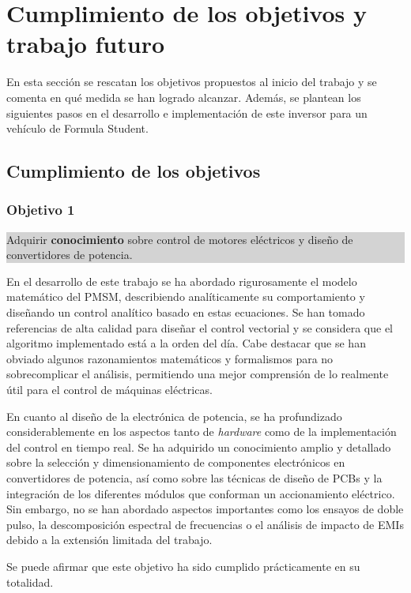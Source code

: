 \newpage
\section{Cumplimiento de los objetivos y trabajo futuro}

En esta sección se rescatan los objetivos propuestos al inicio del trabajo y se comenta en qué medida se han logrado alcanzar. Además, se plantean los siguientes pasos en el desarrollo e implementación de este inversor para un vehículo de Formula Student.

\subsection{Cumplimiento de los objetivos}

\subsubsection*{Objetivo 1}
\colorbox{lightgray}{%
	\parbox{\dimexpr\linewidth-2\fboxsep-2\fboxrule}{%
		Adquirir \textbf{conocimiento} sobre control de motores eléctricos y diseño de convertidores de potencia.%
	}%
}

En el desarrollo de este trabajo se ha abordado rigurosamente el modelo matemático del PMSM, describiendo analíticamente su comportamiento y diseñando un control analítico basado en estas ecuaciones. Se han tomado referencias de alta calidad para diseñar el control vectorial y se considera que el algoritmo implementado está a la orden del día. Cabe destacar que se han obviado algunos razonamientos matemáticos y formalismos para no sobrecomplicar el análisis, permitiendo una mejor comprensión de lo realmente útil para el control de máquinas eléctricas.

En cuanto al diseño de la electrónica de potencia, se ha profundizado considerablemente en los aspectos tanto de \textit{hardware} como de la implementación del control en tiempo real. Se ha adquirido un conocimiento amplio y detallado sobre la selección y dimensionamiento de componentes electrónicos en convertidores de potencia, así como sobre las técnicas de diseño de PCBs y la integración de los diferentes módulos que conforman un accionamiento eléctrico. Sin embargo, no se han abordado aspectos importantes como los ensayos de doble pulso, la descomposición espectral de frecuencias o el análisis de impacto de EMIs debido a la extensión limitada del trabajo.

Se puede afirmar que este objetivo ha sido cumplido prácticamente en su totalidad.

